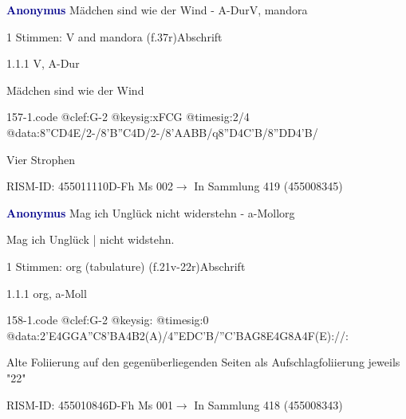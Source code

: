 \documentclass[twocolumn, 12pt]{book}
\begin{document}
\par \vspace{16pt} \textcolor{darkblue}{\textbf{Anonymus  }}\hfillplus{\textbf{[157]}}\newline Mädchen sind wie der Wind - A-Dur\newline V, mandora
\par \begin{itshape}\end{itshape} 
\par \textcolor{darkblue}{}  1 Stimmen: V and mandora  (f.37r)\newline Abschrift
\par 1.1.1  V, A-Dur\newline \begin{footnotesize} Mädchen sind wie der Wind \end{footnotesize}  
\begin{filecontents*}{157-1.code}
@clef:G-2
@keysig:xFCG
@timesig:2/4
@data:8''CD4E/2-/8'B''C4D/2-/8'AABB/q8''D4C'B/8''DD4'B/
\end{filecontents*}
\newline %
\par Vier Strophen
\par RISM-ID: 455011110\newline D-Fh  Ms 002\newline $\rightarrow$ In Sammlung 419 (455008345)
      
\par \vspace{16pt} \textcolor{darkblue}{\textbf{Anonymus  }}\hfillplus{\textbf{[158]}}\newline Mag ich Unglück nicht widerstehn - a-Moll\newline org
\par \begin{itshape}[f.21v, at left:] Mag ich Unglück | nicht widstehn.\end{itshape} 
\par \textcolor{darkblue}{}  1 Stimmen: org (tabulature)  (f.21v-22r)\newline Abschrift
\par 1.1.1  org, a-Moll  
\begin{filecontents*}{158-1.code}
@clef:G-2
@keysig:
@timesig:0
@data:2'E4GGA''C{8'BA}4B2(A)/4''EDC'B/''C'BAG8E4G8A4F(E)://:
\end{filecontents*}
\newline %
\par Alte Foliierung auf den gegenüberliegenden Seiten als Aufschlagfoliierung jeweils "22"
\par RISM-ID: 455010846\newline D-Fh  Ms 001\newline $\rightarrow$ In Sammlung 418 (455008343)
      
\end{document}
